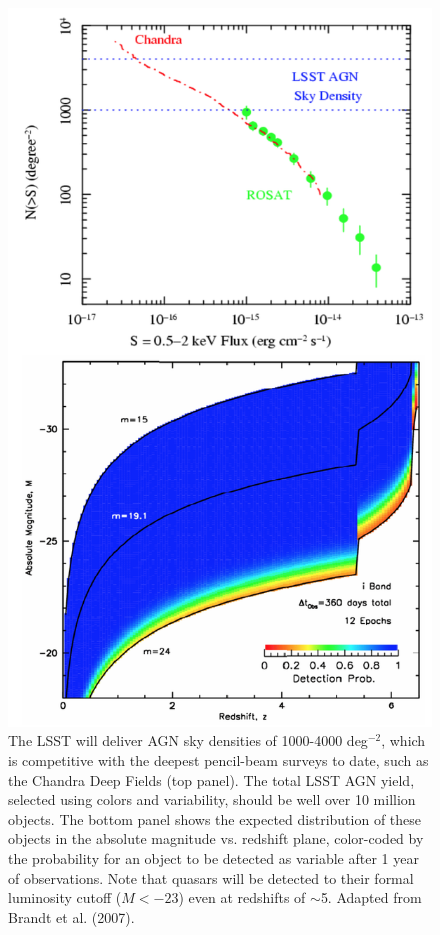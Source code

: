 \documentclass{emulateapj}
\begin{document}
\begin{figure}
\includegraphics[width=1.0\hsize,clip]{panels3.png}
\caption{The LSST will deliver AGN sky densities of 1000-4000 deg$^{-2}$, which is 
competitive with the deepest pencil-beam surveys to date, such as the Chandra
Deep Fields (top panel). The total LSST AGN yield, selected using colors and
variability, should be well over 10 million objects. 
The bottom panel shows the expected distribution of these objects in the 
absolute magnitude vs. redshift plane, color-coded by the probability for
an object to be
detected as variable after 1 year of observations. Note that quasars will
be detected to their formal luminosity cutoff ($M< -23$) even at redshifts
of $\sim$5. Adapted from Brandt et al. (2007).} 
\label{Fig:panels3}
\end{figure}
\end{document}
